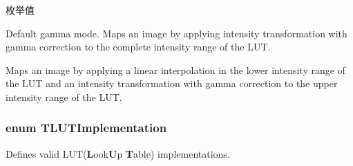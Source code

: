 \begin{Desc}
\item[枚举值]\par
\begin{description}
\item[{\em 
\hypertarget{group___common_interface_ggab9c7c29f6e598477f67fefe0b30addb0a8fcb1fb5e3cead596b428f6d027ff6d6}{L\+U\+Tgm\+Standard}\label{group___common_interface_ggab9c7c29f6e598477f67fefe0b30addb0a8fcb1fb5e3cead596b428f6d027ff6d6}
}]Default gamma mode. Maps an image by applying intensity transformation with gamma correction to the complete intensity range of the L\+U\+T. \item[{\em 
\hypertarget{group___common_interface_ggab9c7c29f6e598477f67fefe0b30addb0a7cf4e665dcebf8004ce9434395b89f0c}{L\+U\+Tgm\+Linear\+Start}\label{group___common_interface_ggab9c7c29f6e598477f67fefe0b30addb0a7cf4e665dcebf8004ce9434395b89f0c}
}]Maps an image by applying a linear interpolation in the lower intensity range of the L\+U\+T and an intensity transformation with gamma correction to the upper intensity range of the L\+U\+T. \end{description}
\end{Desc}
\hypertarget{group___common_interface_ga7ba807ea2d27f199703d303b0901e243}{
\subsubsection[{T\+L\+U\+T\+Implementation}]{\setlength{\rightskip}{0pt plus 5cm}enum {\bf T\+L\+U\+T\+Implementation}}}\label{group___common_interface_ga7ba807ea2d27f199703d303b0901e243}


Defines valid L\+U\+T({\bfseries L}ook{\bfseries U}p {\bfseries T}able) implementations. 

